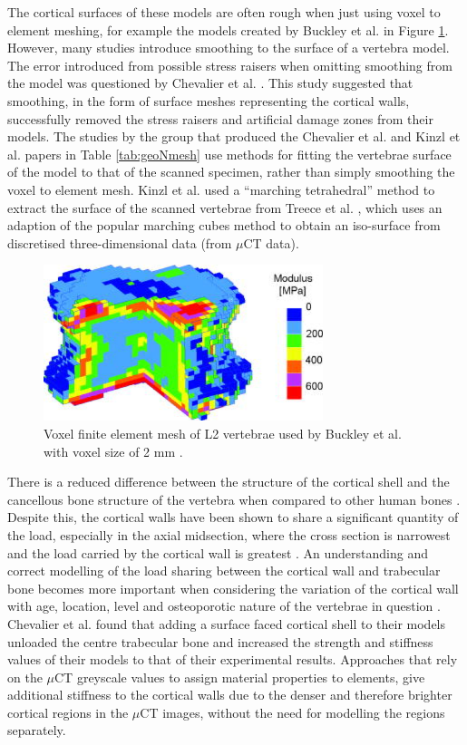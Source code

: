 The cortical surfaces of these models are often rough when just using
voxel to element meshing, for example the models created by Buckley et
al. \cite{Buckley2006} in Figure \ref{fig:buckleymesh}. However, many
studies
introduce
smoothing
to
the surface of a vertebra model. The error introduced from possible
stress raisers when omitting smoothing from the model was questioned by
Chevalier et al. \cite{Chevalier2009}. This study suggested that smoothing, in
the
form of surface meshes representing the cortical walls, successfully
removed the stress raisers and artificial damage zones from their
models. The studies by the group that produced the Chevalier et al. and
Kinzl et al. papers in Table \ref{tab:geoNmesh} use methods for fitting
the vertebrae
surface of the model to that of the scanned specimen, rather than simply
smoothing the voxel to element mesh. Kinzl et al. \cite{Kinzl2012} used a
``marching tetrahedral'' method to extract the surface of the scanned
vertebrae from Treece et al. \cite{Treece1999}, which uses an adaption of the
popular marching cubes method to obtain an iso-surface from discretised
three-dimensional data (from $\mu$CT data).

\begin{figure}[ht!]

\centering
  \includegraphics[width=3.20764in,height=1.79236in]{images/voxelFEMesh.png}
  \caption{Voxel finite element mesh of L2 vertebrae used by Buckley et
al. with voxel size of 2 mm \cite{Buckley2006}.}
\label{fig:buckleymesh}
\end{figure}


There is a reduced difference between the structure of the cortical shell and the
cancellous bone structure of the vertebra when compared to other human
bones \cite{Eswaran2005}. Despite this, the cortical walls have been shown to
share a significant quantity of the load, especially in the axial
midsection, where the cross section is narrowest and the load carried by
the cortical wall is greatest \cite{Eswaran2005}. An understanding and correct
modelling of the load sharing between the cortical wall and trabecular
bone becomes more important when considering the variation of the
cortical wall with age, location, level and osteoporotic nature of the
vertebrae in question \cite{Ritzel1997}. Chevalier et al. \cite{Chevalier2009}
found
that
adding a surface faced cortical shell to their models unloaded the
centre trabecular bone and increased the strength and stiffness values
of their models to that of their experimental results. Approaches that
rely on the $\mu$CT greyscale values to assign material properties to
elements, give additional stiffness to the cortical walls due to the
denser and therefore brighter cortical regions in the $\mu$CT images,
without the need for modelling the regions separately.

